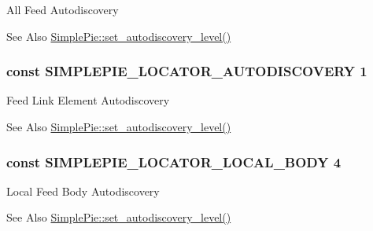 All Feed Autodiscovery \begin{DoxySeeAlso}{See Also}
\hyperlink{class_simple_pie_a4143ba9d144fe53d73c2f2a4f4136371}{Simple\-Pie\-::set\-\_\-autodiscovery\-\_\-level()} 
\end{DoxySeeAlso}
\hypertarget{simplepie_8inc_a3bf370e1d9a3daecaa1e3da59cff24b8}{
\subsubsection[{S\-I\-M\-P\-L\-E\-P\-I\-E\-\_\-\-L\-O\-C\-A\-T\-O\-R\-\_\-\-A\-U\-T\-O\-D\-I\-S\-C\-O\-V\-E\-R\-Y}]{\setlength{\rightskip}{0pt plus 5cm}const S\-I\-M\-P\-L\-E\-P\-I\-E\-\_\-\-L\-O\-C\-A\-T\-O\-R\-\_\-\-A\-U\-T\-O\-D\-I\-S\-C\-O\-V\-E\-R\-Y 1}}\label{simplepie_8inc_a3bf370e1d9a3daecaa1e3da59cff24b8}
Feed Link Element Autodiscovery \begin{DoxySeeAlso}{See Also}
\hyperlink{class_simple_pie_a4143ba9d144fe53d73c2f2a4f4136371}{Simple\-Pie\-::set\-\_\-autodiscovery\-\_\-level()} 
\end{DoxySeeAlso}
\hypertarget{simplepie_8inc_a2300fe90d0b3ea85970ae5b29de7792f}{
\subsubsection[{S\-I\-M\-P\-L\-E\-P\-I\-E\-\_\-\-L\-O\-C\-A\-T\-O\-R\-\_\-\-L\-O\-C\-A\-L\-\_\-\-B\-O\-D\-Y}]{\setlength{\rightskip}{0pt plus 5cm}const S\-I\-M\-P\-L\-E\-P\-I\-E\-\_\-\-L\-O\-C\-A\-T\-O\-R\-\_\-\-L\-O\-C\-A\-L\-\_\-\-B\-O\-D\-Y 4}}\label{simplepie_8inc_a2300fe90d0b3ea85970ae5b29de7792f}
Local Feed Body Autodiscovery \begin{DoxySeeAlso}{See Also}
\hyperlink{class_simple_pie_a4143ba9d144fe53d73c2f2a4f4136371}{Simple\-Pie\-::set\-\_\-autodiscovery\-\_\-level()} 
\end{DoxySeeAlso}
